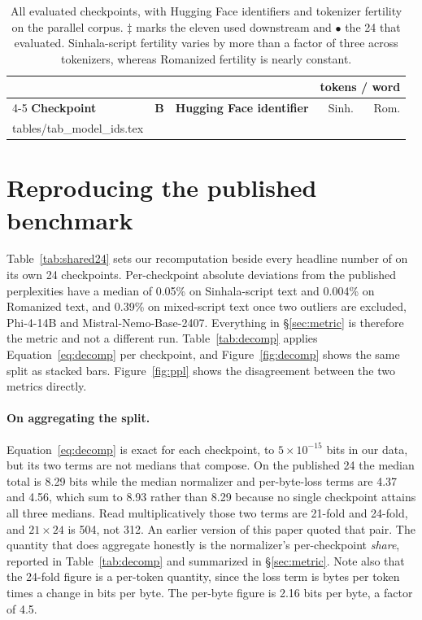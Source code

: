 \documentclass{article}
\makeatletter
\newcommand{\rows}[1]{\@@input #1 }
\makeatother
\begin{document}
\begin{table}[t]
\caption{All evaluated checkpoints, with Hugging Face identifiers and tokenizer
fertility on the parallel corpus. $\ddagger$ marks the eleven used downstream and
$\bullet$ the 24 that \citet{rajapakse-weerasinghe-2026-script} evaluated.
Sinhala-script fertility varies by more than a factor of three across tokenizers,
whereas Romanized fertility is nearly constant.}
\label{tab:modelids}
\centering\footnotesize
\setlength{\tabcolsep}{4pt}
\begin{tabular}{@{}lrlrr@{}}
\toprule
& & & \multicolumn{2}{c}{\textbf{tokens / word}} \\
\cmidrule(lr){4-5}
\textbf{Checkpoint} & \textbf{B} & \textbf{Hugging Face identifier}
& Sinh. & Rom. \\
\midrule
\rows{tables/tab_model_ids.tex}
\bottomrule
\end{tabular}
\end{table}

\section{Reproducing the published benchmark}
\label{sec:reproduction}

Table~\ref{tab:shared24} sets our recomputation beside every headline number of
\citet{rajapakse-weerasinghe-2026-script} on its own 24 checkpoints. Per-checkpoint
absolute deviations from the published perplexities have a median of 0.05\% on
Sinhala-script text and 0.004\% on Romanized text, and 0.39\% on mixed-script text
once two outliers are excluded, Phi-4-14B and Mistral-Nemo-Base-2407. Everything in
\S\ref{sec:metric} is therefore the metric and not a different run.
Table~\ref{tab:decomp} applies Equation~\ref{eq:decomp} per checkpoint, and
Figure~\ref{fig:decomp} shows the same split as stacked bars.
Figure~\ref{fig:ppl} shows the disagreement between the two metrics directly.

\paragraph{On aggregating the split.} Equation~\ref{eq:decomp} is exact for each
checkpoint, to $5 \times 10^{-15}$ bits in our data, but its two terms are not medians that compose. On the published 24 the
median total is 8.29 bits while the median normalizer and per-byte-loss terms are 4.37
and 4.56, which sum to 8.93 rather than 8.29 because no single checkpoint attains all
three medians. Read multiplicatively those two terms are 21-fold and 24-fold, and
$21 \times 24$ is 504, not 312. An earlier version of this paper quoted that pair. The
quantity that does aggregate honestly is the normalizer's per-checkpoint \emph{share},
reported in Table~\ref{tab:decomp} and summarized in \S\ref{sec:metric}. Note also that
the 24-fold figure is a per-token quantity, since the loss term is bytes per token times
a change in bits per byte. The per-byte figure is 2.16 bits per byte, a factor of 4.5.
\end{document}
